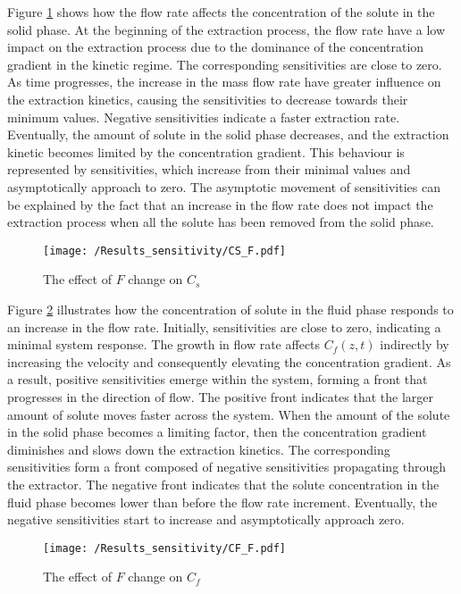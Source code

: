 \documentclass[../Article_Model_Parameters.tex]{subfiles}
\begin{document}
   Figure \ref{fig:Sensitivty_F_CS} shows how the flow rate affects the concentration of the solute in the solid phase. At the beginning of the extraction process, the flow rate have a low impact on the extraction process due to the dominance of the concentration gradient in the kinetic regime. The corresponding sensitivities are close to zero. As time progresses, the increase in the mass flow rate have greater influence on the extraction kinetics, causing the sensitivities to decrease towards their minimum values. Negative sensitivities indicate a faster extraction rate. Eventually, the amount of solute in the solid phase decreases, and the extraction kinetic becomes limited by the concentration gradient. This behaviour is represented by sensitivities, which increase from their minimal values and asymptotically approach to zero. The asymptotic movement of sensitivities can be explained by the fact that an increase in the flow rate does not impact the extraction process when all the solute has been removed from the solid phase.
    
    \begin{figure}[h!]
    	\centering
    	\texttt{[image: /Results\_sensitivity/CS\_F.pdf]}
    	\caption{The effect of $F$ change on $C_s$}
    	\label{fig:Sensitivty_F_CS}
    \end{figure}
    
    Figure \ref{fig:Sensitivty_F_CF} illustrates how the concentration of solute in the fluid phase responds to an increase in the flow rate. Initially, sensitivities are close to zero, indicating a minimal system response. The growth in flow rate affects $C_f(z,t)$ indirectly by increasing the velocity and consequently elevating the concentration gradient. As a result, positive sensitivities emerge within the system, forming a front that progresses in the direction of flow. The positive front indicates that the larger amount of solute moves faster across the system. When the amount of the solute in the solid phase becomes a limiting factor, then the concentration gradient diminishes and slows down the extraction kinetics. The corresponding sensitivities form a front composed of negative sensitivities propagating through the extractor. The negative front indicates that the solute concentration in the fluid phase becomes lower than before the flow rate increment. Eventually, the negative sensitivities start to increase and asymptotically approach zero.
    
    \begin{figure}[h!]
    	\centering
    	\texttt{[image: /Results\_sensitivity/CF\_F.pdf]}
    	\caption{The effect of $F$ change on $C_f$}
    	\label{fig:Sensitivty_F_CF}
    \end{figure}
\end{document}
